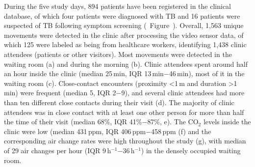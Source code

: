 \documentclass[fleqn,11pt]{wlscirep}
\begin{document}
During the five study days, 894 patients have been registered in the clinical database, of which four patients were diagnosed with TB and 16 patients were suspected of TB following symptom screening (\supp~Figure~). Overall, 1,563 unique movements were detected in the clinic after processing the video sensor data, of which 125 were labeled as being from healthcare workers, identifying 1,438 clinic attendees (patients or other visitors). Most movements were detected in the waiting room (a) and during the morning (b). Clinic attendees spent around half an hour inside the clinic (median 25\,min, IQR 13\,min$-$46\,min), most of it in the waiting room (c). Close-contact encounters (proximity <1\,m and duration >1\,min) were frequent (median 5, IQR 2$-$9), and several clinic attendees had more than ten different close contacts during their visit (d). The majority of clinic attendees was in close contact with at least one other person for more than half the time of their visit (median 68\%, IQR 41\%$-$87\%, e). The CO$_2$ levels inside the clinic were low (median 431\,ppm, IQR 406\,ppm$-$458\,ppm (f) and the corresponding air change rates were high throughout the study (g), with \eg median of 29 air changes per hour (IQR 9\,h$^{-1}$$-$36\,h$^{-1}$) in the densely occupied waiting room. 
\end{document}
